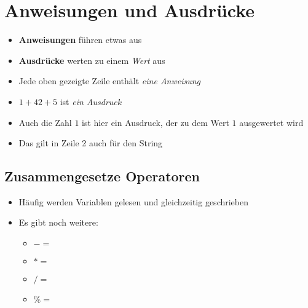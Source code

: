 \section{Anweisungen und Ausdrücke}
\begin{frame}
    \slidehead
    \begin{itemize}
        \item \textbf{Anweisungen} führen etwas aus
        \item \textbf{Ausdrücke} werten zu einem \textit{Wert} aus
    \end{itemize}
    \pause
    \begin{itemize}
        \item Jede oben gezeigte Zeile enthält \textit{eine Anweisung}
        \item $1 + 42 + 5$ ist \textit{ein Ausdruck}
            \pause
        \item Auch die Zahl $1$ ist hier ein Ausdruck, der zu dem Wert $1$ ausgewertet wird
        \item Das gilt in Zeile 2 auch für den String
    \end{itemize}

\end{frame}




\subsection{Zusammengesetze Operatoren}
\begin{frame}
    \slidehead

    \begin{itemize}
        \item Häufig werden Variablen gelesen und gleichzeitig geschrieben
    \end{itemize}


    \begin{itemize}
        \item Es gibt noch weitere:
            \begin{itemize}
                \item $-=$
                \item $*=$
                \item $/=$
                \item $\%=$
            \end{itemize}
    \end{itemize}
\end{frame}

